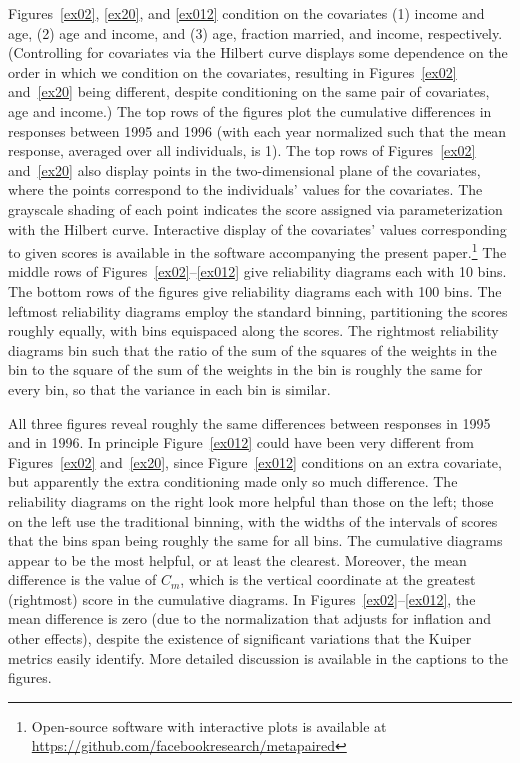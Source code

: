 \documentclass[]{fairmeta}
\begin{document}
Figures~\ref{ex02}, \ref{ex20}, and \ref{ex012} condition on the covariates
(1) income and age, (2) age and income,
and (3) age, fraction married, and income, respectively.
(Controlling for covariates via the Hilbert curve displays some dependence
on the order in which we condition on the covariates,
resulting in Figures~\ref{ex02} and~\ref{ex20} being different,
despite conditioning on the same pair of covariates, age and income.)
The top rows of the figures plot the cumulative differences in responses
between 1995 and 1996 (with each year normalized such that the mean response,
averaged over all individuals, is 1).
The top rows of Figures~\ref{ex02} and~\ref{ex20} also display
points in the two-dimensional plane of the covariates,
where the points correspond to the individuals' values for the covariates.
The grayscale shading of each point indicates the score assigned
via parameterization with the Hilbert curve. Interactive display
of the covariates' values corresponding to given scores is available
in the software accompanying the present paper.\footnote{Open-source software
with interactive plots is available at
\url{https://github.com/facebookresearch/metapaired}}
The middle rows of Figures~\ref{ex02}--\ref{ex012} give reliability diagrams
each with 10 bins.
The bottom rows of the figures give reliability diagrams each with 100 bins.
The leftmost reliability diagrams employ the standard binning,
partitioning the scores roughly equally, with bins equispaced along the scores.
The rightmost reliability diagrams bin such that the ratio
of the sum of the squares of the weights in the bin
to the square of the sum of the weights in the bin
is roughly the same for every bin, so that the variance in each bin is similar.

All three figures reveal roughly the same differences between responses
in 1995 and in 1996. In principle Figure~\ref{ex012}
could have been very different from Figures~\ref{ex02} and~\ref{ex20},
since Figure~\ref{ex012} conditions on an extra covariate,
but apparently the extra conditioning made only so much difference.
The reliability diagrams on the right look more helpful
than those on the left; those on the left use the traditional binning,
with the widths of the intervals of scores
that the bins span being roughly the same for all bins.
The cumulative diagrams appear to be the most helpful,
or at least the clearest.
Moreover, the mean difference is the value of $C_m$,
which is the vertical coordinate at the greatest (rightmost) score
in the cumulative diagrams. In Figures~\ref{ex02}--\ref{ex012},
the mean difference is zero (due to the normalization that adjusts
for inflation and other effects), despite the existence
of significant variations that the Kuiper metrics easily identify.
More detailed discussion is available in the captions to the figures.
\end{document}
